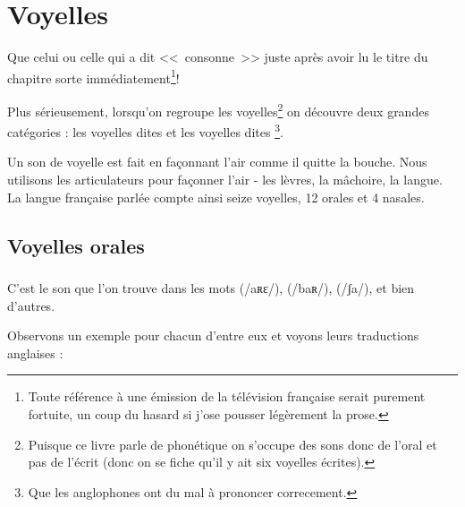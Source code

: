 \chapter{Voyelles}\label{chap:voy}
Que celui ou celle qui a dit <<~consonne~>> juste après avoir lu le
titre du chapitre sorte immédiatement\footnote{Toute référence à une
  émission de la télévision française serait purement fortuite, un
  coup du hasard si j'ose pousser légèrement la prose.}!\par
Plus sérieusement, lorsqu'on regroupe les voyelles\footnote{Puisque ce
  livre parle de phonétique on s'occupe des sons donc de l'oral et pas
  de l'écrit (donc on se fiche qu'il y ait six voyelles écrites).} on
découvre deux grandes catégories : les voyelles dites  et
les voyelles dites \footnote{Que les anglophones ont du
  mal à prononcer correcement.}.

Un son de voyelle est fait en façonnant l'air comme il quitte la
bouche. Nous utilisons les articulateurs pour façonner l'air - les
lèvres, la mâchoire, la langue. La langue française parlée compte
ainsi seize voyelles, 12 orales et 4 nasales.

\section{Voyelles orales}\label{sec:orales}
\subsection{}\label{subsec:afr}

C'est le son que l'on trouve dans les mots  (/aʀɛ/),
 (/baʀ/),  (/ʃa/), et bien
d'autres. 

Observons un exemple pour chacun d'entre eux et voyons leurs
traductions anglaises :\par

